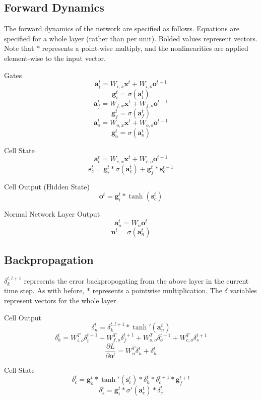 \documentclass[11pt]{article}
\begin{document}
\subsection{Forward Dynamics}
The forward dynamics of the network are specified as follows. Equations
are specified for a whole layer (rather than per unit).
 Bolded values represent vectors. Note that \(*\)
represents a point-wise multiply, and the nonlinearities are applied
element-wise to the input vector.

Gates
\[ \textbf{a}_{i}^{t} = W_{i,x}\textbf{x}^{t} +  W_{i,o}\textbf{o}^{t-1} \] 
\[ \textbf{g}_{i}^{t} = \sigma( \textbf{a}_{i}^{t}) \]
\[ \textbf{a}_{f}^{t} = W_{f,x}\textbf{x}^{t} +  W_{f,o}\textbf{o}^{t-1} \] 
\[ \textbf{g}_{f}^{t} = \sigma( \textbf{a}_{f}^{t}) \]
\[ \textbf{a}_{o}^{t} = W_{o,x}\textbf{x}^{t} +  W_{o,o}\textbf{o}^{t-1} \] 
\[ \textbf{g}_{o}^{t} = \sigma( \textbf{a}_{o}^{t}) \]

Cell State
\[ \textbf{a}_{c}^{t} = W_{c,x}\textbf{x}^{t} +  W_{c,o}\textbf{o}^{t-1} \] 
\[ \textbf{s}_{c}^{t} =  \textbf{g}_{i}^{t} * \sigma( \textbf{a}_{c}^{t}) + \textbf{g}_{f}^{t}*\textbf{s}_{c}^{t-1} \]

Cell Output (Hidden State)
\[ \textbf{o}^{t} =  \textbf{g}_{i}^{t} * \tanh( \textbf{s}_{c}^{t}) \]

Normal Network Layer Output
\[ \textbf{a}_{n}^{t} = W_{n}\textbf{o}^{t} \]
\[ \textbf{n}^{t} = \sigma( \textbf{a}_{n}^{t}) \]

\subsection{Backpropagation}
\(\delta_{k}^{t,l+1}\) represents the error backpropogating from the above layer
in the current time step. 
As with before, \(*\) represents a pointwise multiplication. The \(\delta\) variables
represent vectors for the whole layer.

Cell Output
\[  \delta_{n}^{t} = \delta_{k}^{t,l+1}*\tanh'({\textbf{a}_{n}^{t}}) \]
\[ \delta_{h}^{t} = W_{i,o}^{T}\delta_{i}^{t+1} +  W_{f,o}^{T}\delta_{f}^{t+1} +  W_{o,o}^{T}\delta_{o}^{t+1} +  W_{c,o}^{T}\delta_{s}^{t+1} \]
\[ \frac{\partial L}{\partial \textbf{o}^{t}} = W_{n}^{T} \delta_{n}^{t} +  \delta_{h}^{t} \]

Cell State
\[ \delta_{c}^{t} = \textbf{g}_{o}^{t} * \tanh'({\textbf{s}_{c}^{t}}) * \delta_{h}^{t} * \delta_{c}^{t+1} * \textbf{g}_{f}^{t+1} \]
\[ \delta_{s}^{t} = \textbf{g}_{i}^{t} * \sigma'(\textbf{a}_{c}^{t}) * \delta_{c}^{t} \]
\end{document}
